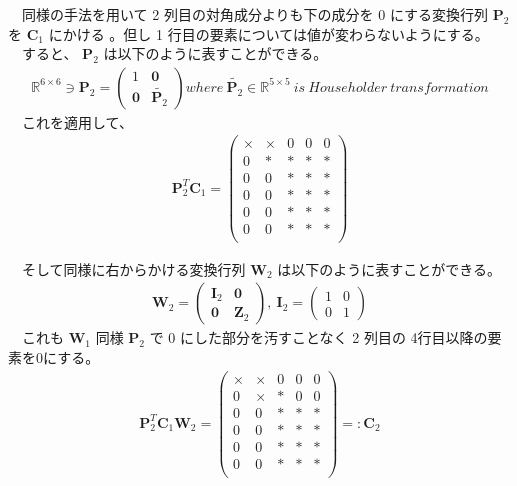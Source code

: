 \documentclass[dvipdfmx,10pt,presentation]{beamer}
\begin{document}
\begin{frame}[label={sec:orgda9b847}]{}
　同様の手法を用いて 2 列目の対角成分よりも下の成分を 0 にする変換行列 \(\bm{P}_2\) を \(\bm{C}_1\) にかける 。但し 1 行目の要素については値が変わらないようにする。\\
　すると、 \(\bm{P}_2\) は以下のように表すことができる。\\
\begin{align*}
\mathbb{R}^{6\times 6} \ni \bm{P}_2 =
\begin{pmatrix}
1 & \bm{0}\\
\bm{0} & \tilde{\bm{P}_2}
\end{pmatrix}
where\ \tilde{\bm{P}_2} \in \mathbb{R}^{5\times5}\ is\ Householder\ transformation
\end{align*}
　これを適用して、\\
\begin{align*}
\bm{P}^T_2\bm{C}_1 = 
\begin{pmatrix}
\times & \times & 0 & 0 & 0\\ 
0 & \ast & \ast & \ast & \ast\\
0 & 0 & \ast & \ast & \ast\\
0 & 0 & \ast & \ast & \ast\\
0 & 0 & \ast & \ast & \ast\\
0 & 0 & \ast & \ast & \ast\\
\end{pmatrix}
\end{align*}
\end{frame}
\begin{frame}[label={sec:org30458df}]{}
　そして同様に右からかける変換行列 \(\bm{W}_2\) は以下のように表すことができる。\\
\begin{align*}
\bm{W}_2 =
\begin{pmatrix}
\bm{I}_2 & \bm{0}\\
\bm{0} & \bm{Z}_2 
\end{pmatrix}
,\ 
\bm{I}_2 = 
\begin{pmatrix}
1 & 0 \\
0 & 1
\end{pmatrix}
\end{align*}
　これも \(\bm{W}_1\) 同様 \(\bm{P}_2\) で 0 にした部分を汚すことなく 2 列目の 4行目以降の要素を0にする。\\
\begin{align*}
\bm{P}^T_2\bm{C}_1\bm{W}_2 = 
\begin{pmatrix}
\times & \times & 0 & 0 & 0 \\  
0 & \times & \ast & 0 & 0 \\
0 & 0 & \ast & \ast & \ast \\
0 & 0 & \ast & \ast & \ast \\
0 & 0 & \ast & \ast & \ast \\
0 & 0 & \ast & \ast & \ast \\
\end{pmatrix}
=: \bm{C}_2
\end{align*}
\end{frame}
\end{document}

